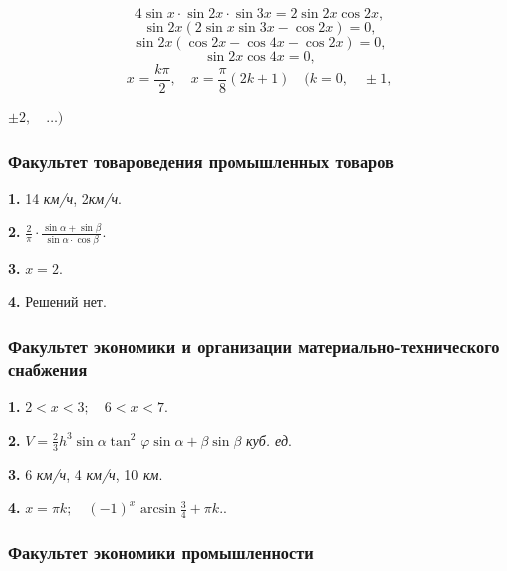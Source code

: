 \documentclass[a4paper, 14pt]{article}
\begin{document}
    \[4\sin{x}\cdot\sin{2x}\cdot\sin{3x} = 2\sin{2x}\cos{2x},\]
    \[\sin{2x}(2\sin{x}\sin{3x} - \cos{2x})=0,\]
    \[\sin{2x}(\cos{2x} - \cos{4x} - \cos{2x})=0,\]
    \[\sin{2x}\cos{4x}=0,\]
    \[x=\frac{k\pi}{2}, \quad x= \frac{\pi}{8}(2k+1) \quad (k=0, \quad \pm1,\]
    \begin{flushright}
        \(\pm2,\quad\dots)\)
    \end{flushright}
    \begin{center}
    \subsubsection*{Факультет товароведения промышленных товаров}
    \end{center}\par
    \begin{doublespace}
    \textbf{1.} 14 \textit{км/ч}, 2\textit{км/ч}.\par
    \textbf{2.} \(\frac{2}{\pi}\cdot\frac{\sin{\alpha} + \sin{\beta}}{\sin{\alpha}\cdot\cos{\beta}}\).\par
    \textbf{3.} \(x=2\).\par
    \textbf{4.} Решений нет.\par
    \end{doublespace}\par
    \begin{center}
    \subsubsection*{Факультет экономики и организации материально-технического снабжения}
    \end{center}\par
    \begin{doublespace}
    \textbf{1.} \(2<x<3; \quad 6<x<7\).\par
    \textbf{2.} \(V=\frac{2}{3}h^3\sin{\alpha}\tan^2{\varphi}\sin{\alpha+\beta}\sin{\beta}\) \textit{куб. ед}.\par
    \textbf{3.} 6 \textit{км/ч}, 4 \textit{км/ч}, 10 \textit{км}.\par
    \textbf{4.} \(x=\pi k; \quad (-1)^{x}\arcsin{\frac{3}{4}} + \pi k.\).\par
    \end{doublespace}
    \pagestyle{fancy}
    \setcounter{page}{77}
    \begin{center}
    \subsubsection*{Факультет экономики промышленности}
    \end{center}\par
\end{document}
